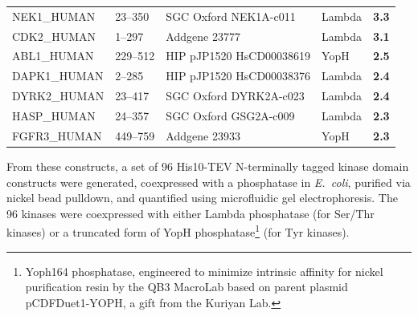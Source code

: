 \documentclass[phd,tocprelim]{cornell}
\begin{document}
\begin{landscape}
\begin{longtable}[c]{lllll}
		NEK1\_HUMAN  & 23--350 & SGC Oxford NEK1A-c011 & Lambda                    & \cellcolor{orange!55}\bf{3.3}                             \\
		CDK2\_HUMAN  & 1--297 & Addgene 23777 & Lambda                    & \cellcolor{orange!55}\bf{3.1}                             \\
		ABL1\_HUMAN  & 229--512 & HIP pJP1520 HsCD00038619 & YopH         & \cellcolor{orange!55}\bf{2.5}                             \\
		DAPK1\_HUMAN & 2--285 & HIP pJP1520 HsCD00038376 & Lambda                    & \cellcolor{orange!55}\bf{2.4}                             \\
		DYRK2\_HUMAN & 23--417 & SGC Oxford DYRK2A-c023 & Lambda                    & \cellcolor{orange!55}\bf{2.4}                             \\
		HASP\_HUMAN  & 24--357 & SGC Oxford GSG2A-c009 &  Lambda                    & \cellcolor{orange!55}\bf{2.3}                             \\
		FGFR3\_HUMAN & 449--759	& Addgene 23933 & YopH         & \cellcolor{orange!55}\bf{2.3}                             \\
		\bottomrule
\end{longtable}
\end{landscape}

From these constructs, a set of 96 His10-TEV N-terminally tagged kinase domain constructs were generated, coexpressed with a phosphatase in \emph{E.~coli}, purified via nickel bead pulldown, and quantified using microfluidic gel electrophoresis.
The 96 kinases were coexpressed with either Lambda phosphatase (for Ser/Thr kinases) or a truncated form of YopH phosphatase\footnote{Yoph164 phosphatase, engineered to minimize intrinsic affinity for nickel purification resin by the QB3 MacroLab based on parent plasmid pCDFDuet1-YOPH, a gift from the Kuriyan Lab.} (for Tyr kinases). 
\end{document}

